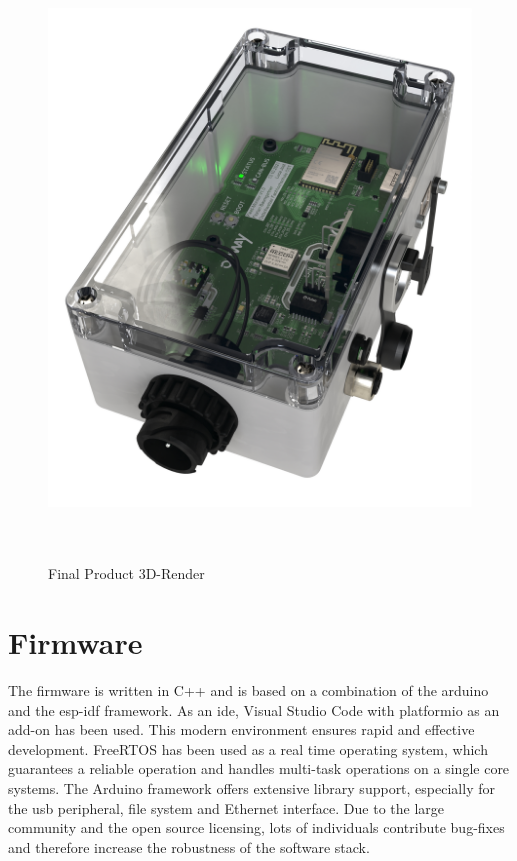 \medskip
\begin{figure}[h!]
	\centering
	\includegraphics[height=16cm]{images/fleet-monitor-rendering}
	\caption{Final Product 3D-Render}
	\label{fig:fleet-monitor-rendering}
\end{figure}
\newpage

\section{Firmware}
The firmware is written in C++ and is based on a combination of the \gls{arduino} and the \gls{esp-idf} framework. As an \acrshort{ide}, Visual Studio Code with \gls{platformio} as an add-on has been used. This modern environment ensures rapid and effective development.\newline
FreeRTOS has been used as a real time operating system, which guarantees a reliable operation and handles multi-task operations on a single core systems.\newline
The Arduino framework offers extensive library support, especially for the \acrshort{usb} peripheral, file system and Ethernet interface. Due to the large community and the open source licensing, lots of individuals contribute bug-fixes and therefore increase the robustness of the software stack.


